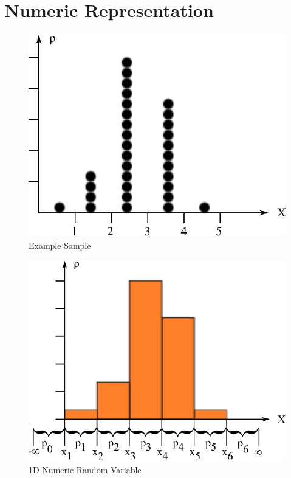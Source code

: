 \section{Numeric Representation}

\begin{figure}
  \centering
  \includegraphics{Images/SkewedNormalHistogram.eps}
  \caption[Example Sample]
          {Example Sample}
  \label{fig:SkewedNormalHistogram2}
\end{figure}

\begin{figure}
  \centering
  \includegraphics{Images/ArbitraryHistogram.eps}
  \caption[1D Numeric Random Variable]
          {1D Numeric Random Variable}
  \label{fig:ArbitraryHistogram}
\end{figure}

